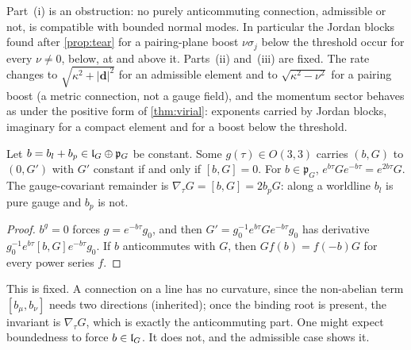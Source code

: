 Part~(i) is an obstruction: no purely anticommuting connection, admissible or not, is compatible with bounded normal modes. In particular the
Jordan blocks found after \cref{prop:tear} for a pairing-plane boost $\nu\sigma_j$ below the threshold occur for every $\nu\neq0$, below, at and above
it. Parts~(ii) and~(iii) are fixed. The rate changes to $\sqrt{\kappa^2+|\mathbf d|^2}$ for an admissible element and to $\sqrt{\kappa^2-\nu^2}$ for a
pairing boost (a metric connection, not a gauge field), and the momentum sector behaves as under the positive form of \cref{thm:virial}:
exponents carried by Jordan blocks, imaginary for a compact element and for a boost below the threshold.

\begin{proposition}
\label{bf:remove}
Let $b=b_l+b_p\in\mathfrak l_G\oplus\mathfrak p_G$ be constant. Some $g(\tau)\in O(3,3)$ carries $(b,G)$ to $(0,G')$ with $G'$ constant if and only if $[b,G]=0$.
For $b\in\mathfrak p_G$, $e^{b\tau}Ge^{-b\tau}=e^{2b\tau}G$. The gauge-covariant remainder is $\nabla_{\!\tau}G=[b,G]=2b_pG$: along a worldline $b_l$ is
pure gauge and $b_p$ is not.
\end{proposition}

\begin{proof}
$b^g=0$ forces $g=e^{-b\tau}g_0$, and then $G'=g_0^{-1}e^{b\tau}Ge^{-b\tau}g_0$ has derivative $g_0^{-1}e^{b\tau}[b,G]e^{-b\tau}g_0$. If $b$ anticommutes
with $G$, then $Gf(b)=f(-b)G$ for every power series $f$.
\end{proof}

This is fixed. A connection on a line has no curvature, since the non-abelian term $[b_\mu,b_\nu]$ needs two directions (inherited); once the
binding root is present, the invariant is $\nabla_{\!\tau}G$, which is exactly the anticommuting part. One might expect boundedness to force
$b\in\mathfrak l_G$. It does not, and the admissible case shows it.

